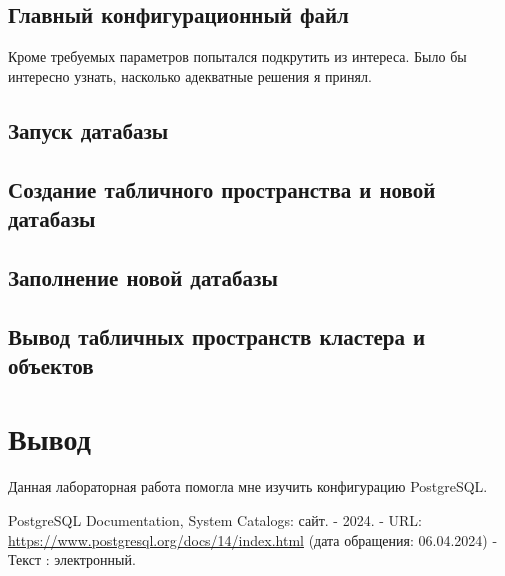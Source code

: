 \documentclass{article}
\begin{document}
\subsection{Главный конфигурационный файл}
Кроме требуемых параметров попытался подкрутить из интереса. Было бы интересно узнать, насколько адекватные решения я принял.


\subsection{Запуск датабазы}


\subsection{Создание табличного пространства и новой датабазы}


\subsection{Заполнение новой датабазы}


\subsection{Вывод табличных пространств кластера и объектов}



\section{Вывод}

Данная лабораторная работа помогла мне изучить конфигурацию PostgreSQL.

\begin{thebibliography}{99}
        PostgreSQL Documentation, System Catalogs: сайт. - 2024. 
        - URL: \url{https://www.postgresql.org/docs/14/index.html} (дата обращения: 06.04.2024) - Текст : электронный.
\end{thebibliography}
\end{document}
